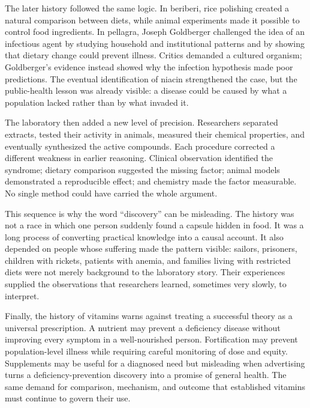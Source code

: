 \documentclass[12pt,oneside]{book}
\begin{document}
The later history followed the same logic. In beriberi, rice polishing created a
natural comparison between diets, while animal experiments made it possible to
control food ingredients. In pellagra, Joseph Goldberger challenged the idea of
an infectious agent by studying household and institutional patterns and by
showing that dietary change could prevent illness. Critics demanded a cultured
organism; Goldberger's evidence instead showed why the infection hypothesis
made poor predictions. The eventual identification of niacin strengthened the
case, but the public-health lesson was already visible: a disease could be
caused by what a population lacked rather than by what invaded it.

The laboratory then added a new level of precision. Researchers separated
extracts, tested their activity in animals, measured their chemical properties,
and eventually synthesized the active compounds. Each procedure corrected a
different weakness in earlier reasoning. Clinical observation identified the
syndrome; dietary comparison suggested the missing factor; animal models
demonstrated a reproducible effect; and chemistry made the factor measurable.
No single method could have carried the whole argument.

This sequence is why the word ``discovery'' can be misleading. The history was
not a race in which one person suddenly found a capsule hidden in food. It was
a long process of converting practical knowledge into a causal account. It
also depended on people whose suffering made the pattern visible: sailors,
prisoners, children with rickets, patients with anemia, and families living
with restricted diets were not merely background to the laboratory story. Their
experiences supplied the observations that researchers learned, sometimes very
slowly, to interpret.

Finally, the history of vitamins warns against treating a successful theory as
a universal prescription. A nutrient may prevent a deficiency disease without
improving every symptom in a well-nourished person. Fortification may prevent
population-level illness while requiring careful monitoring of dose and equity.
Supplements may be useful for a diagnosed need but misleading when advertising
turns a deficiency-prevention discovery into a promise of general health. The
same demand for comparison, mechanism, and outcome that established vitamins
must continue to govern their use.
\end{document}
